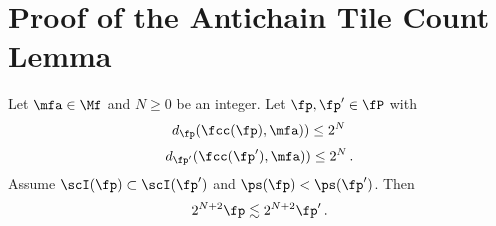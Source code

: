 \section{Proof of the Antichain Tile Count Lemma}
\label{subsec-geolem}


\begin{lemma}\label{tile-reach}
Let $\mfa\in \Mf$ and $N\ge0$ be an integer.
Let $\fp, \fp'\in \fP$ with
\begin{equation}\label{eqassumedismfa}
    d_{\fp}(\fcc(\fp), \mfa))\le 2^N\,
\end{equation}
\begin{equation}\label{eqassumedismfap}
    d_{\fp'}(\fcc(\fp'), \mfa))\le 2^N\, .
\end{equation}
Assume $\scI(\fp)\subset \scI(\fp')$ and $\ps(\fp)<\ps(\fp')$.
Then
\begin{equation}\label{lp'lp''}2^{N+2}\fp\lesssim 2^{N+2} \fp'\, .
\end{equation}
\end{lemma}

